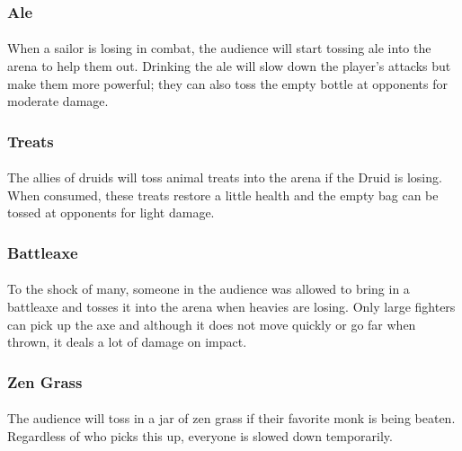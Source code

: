 \subsubsection{Ale}

\paragraph{} When a sailor is losing in combat, the audience will start tossing ale into the arena to help them out. Drinking the ale will slow down the player's attacks but make them more powerful; they can also toss the empty bottle at opponents for moderate damage.

\subsubsection{Treats}

\paragraph{} The allies of druids will toss animal treats into the arena if the Druid is losing. When consumed, these treats restore a little health and the empty bag can be tossed at opponents for light damage.

\subsubsection{Battleaxe}

\paragraph{} To the shock of many, someone in the audience was allowed to bring in a battleaxe and tosses it into the arena when heavies are losing. Only large fighters can pick up the axe and although it does not move quickly or go far when thrown, it deals a lot of damage on impact.

\subsubsection{Zen Grass}

\paragraph{} The audience will toss in a jar of zen grass if their favorite monk is being beaten. Regardless of who picks this up, everyone is slowed down temporarily.


